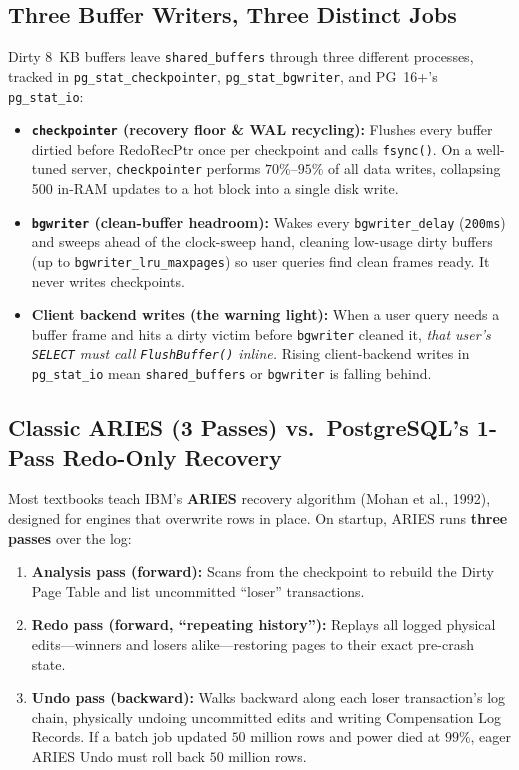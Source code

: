 \subsection{Three Buffer Writers, Three Distinct Jobs}

Dirty 8~KB buffers leave \texttt{shared\_buffers} through three different processes, tracked in \texttt{pg\_stat\_checkpointer}, \texttt{pg\_stat\_bgwriter}, and PG~16+'s \texttt{pg\_stat\_io}:

\begin{itemize}
  \item \textbf{\texttt{checkpointer} (recovery floor \& WAL recycling):} Flushes every buffer dirtied before $\mathrm{RedoRecPtr}$ once per checkpoint and calls \texttt{fsync()}. On a well-tuned server, \texttt{checkpointer} performs $70\%$--$95\%$ of all data writes, collapsing 500 in-RAM updates to a hot block into a single disk write.
  \item \textbf{\texttt{bgwriter} (clean-buffer headroom):} Wakes every \texttt{bgwriter\_delay} (\texttt{200ms}) and sweeps ahead of the clock-sweep hand, cleaning low-usage dirty buffers (up to \texttt{bgwriter\_lru\_maxpages}) so user queries find clean frames ready. It never writes checkpoints.
  \item \textbf{Client backend writes (the warning light):} When a user query needs a buffer frame and hits a dirty victim before \texttt{bgwriter} cleaned it, \emph{that user's \texttt{SELECT} must call \texttt{FlushBuffer()} inline.} Rising client-backend writes in \texttt{pg\_stat\_io} mean \texttt{shared\_buffers} or \texttt{bgwriter} is falling behind.
\end{itemize}

\subsection{Classic ARIES (3 Passes) vs.\ PostgreSQL's 1-Pass Redo-Only Recovery}

Most textbooks teach IBM's \textbf{ARIES} recovery algorithm (Mohan et al., 1992), designed for engines that overwrite rows in place. On startup, ARIES runs \textbf{three passes} over the log:
\begin{enumerate}
  \item \textbf{Analysis pass (forward):} Scans from the checkpoint to rebuild the Dirty Page Table and list uncommitted ``loser'' transactions.
  \item \textbf{Redo pass (forward, ``repeating history''):} Replays all logged physical edits---winners and losers alike---restoring pages to their exact pre-crash state.
  \item \textbf{Undo pass (backward):} Walks backward along each loser transaction's log chain, physically undoing uncommitted edits and writing Compensation Log Records. If a batch job updated $50\text{ million}$ rows and power died at $99\%$, eager ARIES Undo must roll back $50\text{ million}$ rows.
\end{enumerate}


